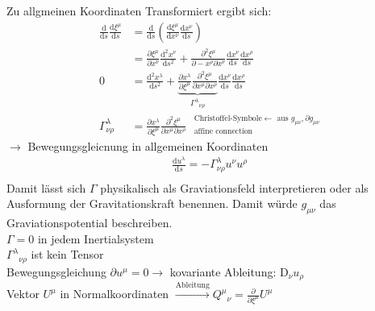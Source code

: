 \documentclass[a4paper]{article}
\begin{document}
Zu allgmeinen Koordinaten Transformiert ergibt sich:
\begin{align}
\frac{\mathrm{d}}{\mathrm{d}s}\frac{\mathrm{d}\xi^\mu}{\mathrm{d}s}&=
\frac{\mathrm{d}}{\mathrm{d}s}\left( \frac{\mathrm{d}\xi^\mu}{\mathrm{d}x^\nu}
\frac{\mathrm{d}x^\nu}{\mathrm{d}s} \right)\\
&=\frac{\partial \xi^\mu}{\partial x^\nu}
\frac{\mathrm{d}^2x^\nu}{\mathrm{d}s^2}+\frac{\partial^2 \xi^\mu}{\partial-
x^\rho \partial x^\nu}
\frac{\mathrm{d}x^\nu}{\mathrm{d}s} \frac{\mathrm{d}x^\rho}{\mathrm{d}s}\\
0&=\frac{\mathrm{d}^2x^\lambda}{\mathrm{d}s^2}+\underbrace{\frac{\partial
x^\lambda}{\partial \xi^\mu}\frac{\partial^2 \xi^\mu}{\partial x^\mu
\partial x^\rho}}_{\Gamma^\lambda{}_{\nu\rho}}
\frac{\mathrm{d}x^\nu}{\mathrm{d}s} \frac{\mathrm{d}x^\rho}{\mathrm{d}s}\\
\Gamma^\lambda_{\nu\rho}&=\frac{\partial
x^\lambda}{\partial \xi^\mu}\frac{\partial^2 \xi^\mu}{\partial x^\mu
\partial x^\rho} \ \ \ {}^{\text{Christoffel-Symbole}\leftarrow
\text{ aus } g_{\mu\nu},\partial g_{\mu\nu}}_{\text{affine connection}}
\end{align}
$\rightarrow$ Bewegungsgleicnung in allgemeinen Koordinaten
\begin{align}
\frac{\mathrm{d} u^\lambda}{\mathrm{d}s}=-\Gamma^\lambda_{\nu\rho}u^\nu u^\rho\\
\end{align}
Damit lässt sich $\Gamma$ physikalisch als Graviationsfeld interpretieren oder
als Ausformung der Gravitationskraft benennen. Damit würde $g_{\mu\nu}$ das
Graviationspotential beschreiben.\\
$\Gamma=0$ in jedem Inertialsystem\\
$\Gamma^\lambda{}_{\nu\rho}$ ist kein Tensor\\
Bewegungsgleichung $\partial u^\mu=0 \longrightarrow$ kovariante Ableitung:
$\mathrm{D}_\nu u_\rho$\\
Vektor $U^\mu$ in Normalkoordinaten
$\overset{\text{Ableitung}}{\longrightarrow}
Q^\mu{}_\nu=\frac{\partial}{\partial \xi^\mu} U^\mu$\\
\end{document}
